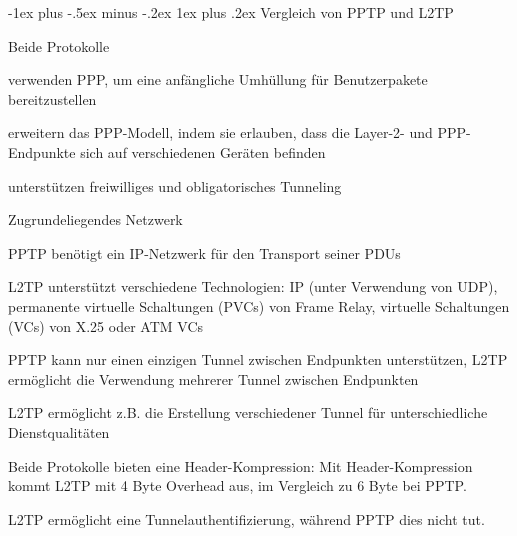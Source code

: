 \documentclass[a4paper]{article}
\makeatletter
\renewcommand{\subsubsection}{\@startsection{subsubsection}{3}{0mm}%
 {-1ex plus -.5ex minus -.2ex}%
 {1ex plus .2ex}%
 {\normalfont\small\bfseries}}
\makeatother
\begin{document}
\begin{multicols}{3}
      \subsubsection{Vergleich von PPTP und L2TP}
      \begin{itemize*}
            \item Beide Protokolle
            \begin{itemize*}
                  \item verwenden PPP, um eine anfängliche Umhüllung für Benutzerpakete bereitzustellen
                  \item erweitern das PPP-Modell, indem sie erlauben, dass die Layer-2- und PPP-Endpunkte sich auf verschiedenen Geräten befinden
                  \item unterstützen freiwilliges und obligatorisches Tunneling
            \end{itemize*}
            \item Zugrundeliegendes Netzwerk
            \begin{itemize*}
                  \item PPTP benötigt ein IP-Netzwerk für den Transport seiner PDUs
                  \item L2TP unterstützt verschiedene Technologien: IP (unter Verwendung von UDP), permanente virtuelle Schaltungen (PVCs) von Frame Relay, virtuelle Schaltungen (VCs) von X.25 oder ATM VCs
            \end{itemize*}
            \item PPTP kann nur einen einzigen Tunnel zwischen Endpunkten unterstützen, L2TP ermöglicht die Verwendung mehrerer Tunnel zwischen Endpunkten
            \begin{itemize*}
                  \item L2TP ermöglicht z.B. die Erstellung verschiedener Tunnel für unterschiedliche Dienstqualitäten
            \end{itemize*}
            \item Beide Protokolle bieten eine Header-Kompression:  Mit Header-Kompression kommt L2TP mit 4 Byte Overhead aus, im Vergleich zu 6 Byte bei PPTP.
            \item L2TP ermöglicht eine Tunnelauthentifizierung, während PPTP dies nicht tut.
      \end{itemize*}


\end{multicols}
\end{document}
